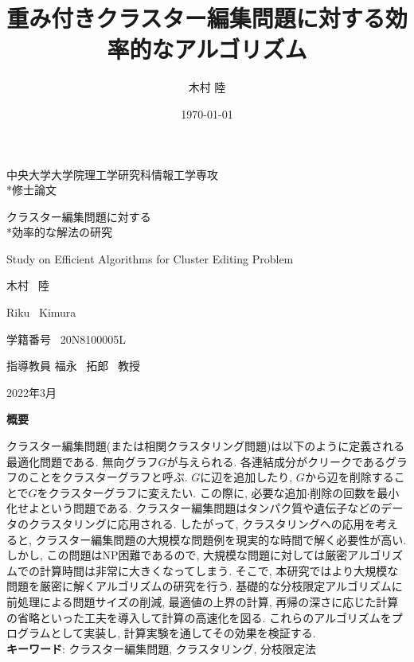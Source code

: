 \documentclass[10.5,a4paper,titlepage, dvipdfmx]{bxjsarticle}
\title{重み付きクラスター編集問題に対する効率的なアルゴリズム}
\author{木村 陸}
\date{\today}
\begin{document}
\begin{center}
    \Large 中央大学大学院理工学研究科情報工学専攻\\*修士論文 \par
    \vspace{30mm}
    \huge クラスター編集問題に対する\\*効率的な解法の研究 \par
    \vspace{15mm}
    \Large Study on Efficient Algorithms for Cluster Editing Problem \par
    \vspace{30mm}
    \Large 木村 \ 陸 \par
    \Large Riku \ Kimura \par
    \Large 学籍番号 \ 20N8100005L\par
    \vspace{15mm}
    \Large 指導教員 \quad 福永 \ 拓郎 \ 教授 \par
    \vspace{30mm}
    \Large 2022年3月
    \vspace{20mm}
\end{center}
\thispagestyle{empty}
\clearpage
\addtocounter{page}{-1}
\noindent
\begin{center}
    \Large \textbf{概要}
\end{center}\par
クラスター編集問題(または相関クラスタリング問題)は以下のように定義される最適化問題である.
無向グラフ$G$が与えられる.
各連結成分がクリークであるグラフのことをクラスターグラフと呼ぶ.
$G$に辺を追加したり, $G$から辺を削除することで$G$をクラスターグラフに変えたい.
この際に, 必要な追加$\cdot$削除の回数を最小化せよという問題である.
クラスター編集問題はタンパク質や遺伝子などのデータのクラスタリングに応用される.
したがって, クラスタリングへの応用を考えると, クラスター編集問題の大規模な問題例を現実的な時間で解く必要性が高い.
しかし, この問題はNP困難であるので, 大規模な問題に対しては厳密アルゴリズムでの計算時間は非常に大きくなってしまう.
そこで, 本研究ではより大規模な問題を厳密に解くアルゴリズムの研究を行う.
基礎的な分枝限定アルゴリズムに前処理による問題サイズの削減, 最適値の上界の計算, 再帰の深さに応じた計算の省略といった工夫を導入して計算の高速化を図る.
これらのアルゴリズムをプログラムとして実装し, 計算実験を通してその効果を検証する.\\

\noindent
\textbf{キーワード}: クラスター編集問題, クラスタリング, 分枝限定法
\clearpage
\end{document}
